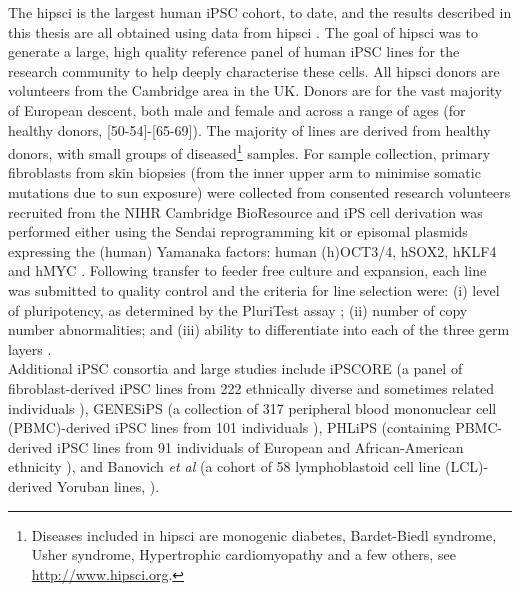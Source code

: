 The \gls{hipsci} is the largest human iPSC cohort, to date, and the results described in this thesis are all obtained using data from \gls{hipsci} \cite{kilpinen2017common}.
The goal of \gls{hipsci} was to generate a large, high quality reference panel of human iPSC lines for the research community to help deeply characterise these cells. 
All \gls{hipsci} donors are volunteers from the Cambridge area in the UK. 
Donors are for the vast majority of European descent, both male and female and across a range of ages (for healthy donors, [50-54]-[65-69]).
The majority of lines are derived from healthy donors, with small groups of diseased\footnote{Diseases included in \gls{hipsci} are monogenic diabetes, Bardet-Biedl syndrome, Usher syndrome, Hypertrophic cardiomyopathy and a few others, see \url{http://www.hipsci.org}.} samples.
For sample collection, primary fibroblasts from skin biopsies (from the inner upper arm to minimise somatic mutations due to sun exposure) were collected from consented research volunteers recruited from the NIHR Cambridge BioResource and iPS cell derivation was performed either using the Sendai reprogramming kit or episomal plasmids expressing the (human) Yamanaka factors: human (h)OCT3/4, hSOX2, hKLF4 and hMYC \cite{yu2009human}.
Following transfer to feeder free culture and expansion, each line was submitted to quality control and the criteria for line selection were: (i) level of pluripotency, as determined by the PluriTest assay \cite{muller2011bioinformatic}; (ii) number of copy number abnormalities; and (iii) ability to differentiate into each of the three germ layers \cite{kilpinen2017common}. \\




Additional iPSC consortia and large studies include
iPSCORE (a panel of fibroblast-derived iPSC lines from 222 ethnically diverse and sometimes related individuals \cite{panopoulos2017ipscore}), GENESiPS (a collection of 317 peripheral blood mononuclear cell (PBMC)-derived iPSC lines from 101 individuals \cite{carcamo2017analysis}), PHLiPS (containing PBMC-derived iPSC lines from 91 individuals of European and African-American ethnicity \cite{pashos2017large}), and Banovich \textit{et al} (a cohort of 58 lymphoblastoid cell line (LCL)-derived Yoruban lines, \cite{banovich2018impact}).

